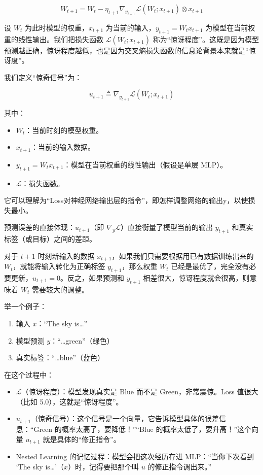 \[
W_{t+1}=W_t-\eta_{t+1}\nabla_{y_{t+1}}\mathcal{L}(W_t;x_{t+1})\otimes x_{t+1}
\tag{4}
\]

设 \(W_t\) 为此时模型的权重，\(x_{t+1}\) 为当前的输入，\(y_{t+1}=W_tx_{t+1}\) 为模型在当前权重的线性输出。我们把损失函数 \(\mathcal{L}(W_t;x_{t+1})\) 称为``惊讶程度''。这既是因为模型预测越正确，惊讶程度越低，也是因为交叉熵损失函数的信息论背景本来就是``惊讶度''。

我们定义``惊奇信号''为：

\[
u_{t+1}\triangleq \nabla_{y_{t+1}}\mathcal{L}(W_t;x_{t+1})
\]

其中：

\begin{itemize}
\tightlist
\item
  \(W_t\)：当前时刻的模型权重。
\item
  \(x_{t+1}\)：当前的输入数据。
\item
  \(y_{t+1}=W_tx_{t+1}\)：模型在当前权重的线性输出（假设是单层 MLP）。
\item
  \(\mathcal{L}\)：损失函数。
\end{itemize}

它可以理解为``Loss对神经网络输出层的指令''，即怎样调整网络的输出y，以使损失最小。

预测误差的直接体现：\(u_{t+1}\)（即 \(\nabla_y\mathcal{L}\)）直接衡量了模型当前的输出 \(y_{t+1}\) 和真实标签（或目标）之间的差距。

对于 \(t+1\) 时刻新输入的数据 \(x_{t+1}\)，如果我们只需要根据用已有数据训练出来的 \(W_t\)，就能将输入转化为正确标签 \(y_{t+1}\)，那么权重 \(W_t\) 已经是最优了，完全没有必要更新，\(u_{t+1}=0\)。反之，如果预测和 \(y_{t+1}\) 相差很大，惊讶程度就会很高，则意味着 \(W_t\) 需要较大的调整。

举一个例子：

\begin{enumerate}
\def\labelenumi{\arabic{enumi}.}
\tightlist
\item
  输入 \(x\)：``The sky is\ldots{}''
\item
  模型预测 \(y\)：``\ldots green''（绿色）
\item
  真实标签：``\ldots blue''（蓝色）
\end{enumerate}

在这个过程中：

\begin{itemize}
\tightlist
\item
  \(\mathcal{L}\)（惊讶程度）：模型发现真实是 Blue 而不是 Green，非常震惊。Loss 值很大（比如 5.0），这就是``惊讶程度''。
\item
  \(u_{t+1}\)（惊奇信号）：这个信号是一个向量，它告诉模型具体的误差信息：``Green 的概率太高了，要降低！''``Blue 的概率太低了，要升高！''这个向量 \(u_{t+1}\) 就是具体的``修正指令''。
\item
  Nested Learning 的记忆过程：模型会把这次经历存进 MLP：``当你下次看到 `The sky is\ldots{}'（\(x\)）时，记得要把那个叫 \(u\) 的修正指令调出来。''
\end{itemize}

